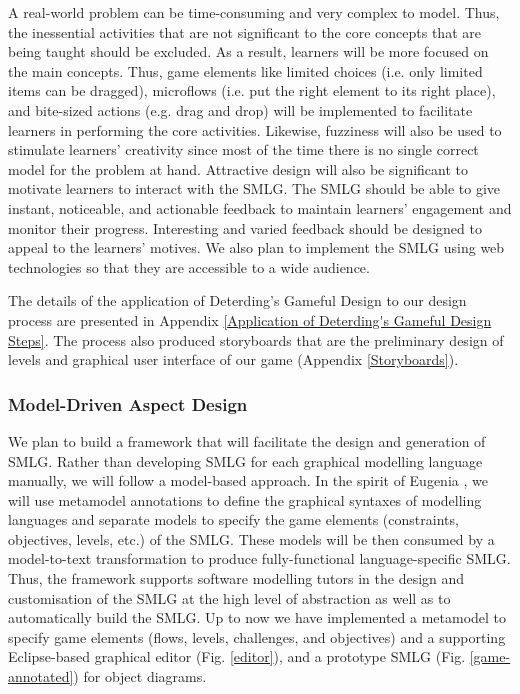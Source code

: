 \documentclass[12pt, a4paper]{report} \usepackage[titletoc]{appendix}
\begin{document}
A real-world problem can be time-consuming and very complex to model. Thus, the inessential activities that are not significant to the core concepts that are being taught should be excluded. As a result, learners will be more focused on the main concepts. Thus, game elements like limited choices (i.e. only limited items can be dragged), microflows (i.e. put the right element to its right place), and bite-sized actions (e.g. drag and drop) will be implemented to facilitate learners in performing the core activities. Likewise, fuzziness will also be used to stimulate learners' creativity since most of the time there is no single correct model for the problem at hand. Attractive design will also be significant to motivate learners to interact with the SMLG. The SMLG should be able to give instant, noticeable, and actionable feedback to maintain learners' engagement and monitor their progress. Interesting and varied feedback should be designed to appeal to the learners' motives. We also plan to implement the SMLG using web technologies so that they are accessible to a wide audience.

The details of the application of Deterding's Gameful Design to our design process are presented in Appendix \ref{Application of Deterding's Gameful Design Steps}. The process also produced storyboards that are the preliminary design of levels and graphical user interface of our game (Appendix \ref{Storyboards}). 

\subsubsection{Model-Driven Aspect Design}
We plan to build a framework that will facilitate the design and generation of SMLG. Rather than developing SMLG for each graphical modelling language manually, we will follow a model-based approach. In the spirit of Eugenia \cite{kolovos2015eugenia}, we will use metamodel annotations to define the graphical syntaxes of modelling languages and separate models to specify the game elements (constraints, objectives, levels, etc.) of the SMLG. These models will be then consumed by a model-to-text transformation to produce fully-functional language-specific SMLG. Thus, the framework supports software modelling tutors in the design and customisation of the SMLG at the high level of abstraction as well as to automatically build the SMLG. Up to now we have implemented a metamodel to specify game elements (flows, levels, challenges, and objectives) and a supporting Eclipse-based graphical editor (Fig. \ref{editor}), and a prototype SMLG (Fig. \ref{game-annotated}) for object diagrams. 
\end{document}
